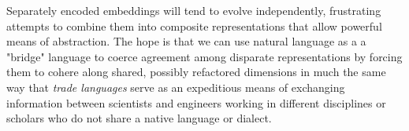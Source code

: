 Separately encoded embeddings will tend to evolve independently, frustrating attempts to combine them into composite representations that allow powerful means of abstraction. The hope is that we can use natural language as a {} \emdash{} a "bridge" language \emdash{} to coerce agreement among disparate representations by forcing them to cohere along shared, possibly refactored dimensions in much the same way that {\it{trade languages}} serve as an expeditious means of exchanging information between scientists and engineers working in different disciplines or scholars who do not share a native language or dialect.


